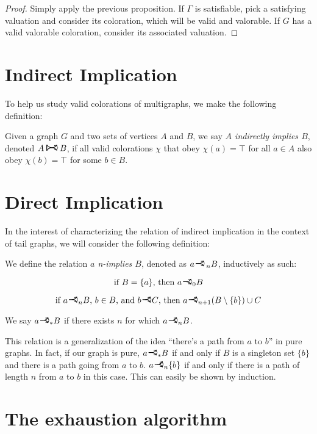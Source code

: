 \documentclass[11pt]{article}
\newcommand{\rightcurveor}{
\!
\mathrel{
  \begin{tikzpicture}[scale=0.8]
    \draw[thick,->] (0,0) arc (90:150:-2ex);
    \draw[thick,->] (0,0) arc (90:30:2ex);
    \draw[thick] (-1ex, 0) -- (0.1ex,0);
  \end{tikzpicture}
}\!
}
\newcommand{\Rightcurvearrow}{
\mathrel{
  \begin{tikzpicture}[scale=0.8]
    \draw[thick,->] (0,1ex) arc (30:150:-2ex);
    \draw[thick,->] (0,-1ex) arc (150:30:2ex);
    \draw[thick] (0, 1ex) -- (0, -1ex);
  \end{tikzpicture}
}
}
\begin{document}
\begin{proof}
Simply apply the previous proposition. If $\Gamma$ is satisfiable, pick a satisfying valuation and consider its coloration, which will be valid and valorable. If $G$ has a valid valorable coloration, consider its associated valuation.
\end{proof}

\section{Indirect Implication}

To help us study valid colorations of multigraphs, we make the following definition:

Given a graph $G$ and two sets of vertices $A$ and $B$, we say \emph{$A$ indirectly implies $B$}, denoted $A \Rightcurvearrow B$, if all valid colorations $\chi$ that obey $\chi(a) = \top$ for all $a \in A$ also obey $\chi(b) = \top$ for some $b \in B$.

\section{Direct Implication}

In the interest of characterizing the relation of indirect implication in the context of tail graphs, we will consider the following definition:

We define the relation \emph{$a$ n-implies $B$}, denoted as $a \rightcurveor_{\,n} B$, inductively as such:

\[\text{if } B = \{a\} \text{, then } a \rightcurveor_0 B\]


\[\text{if } a \rightcurveor_n B \text{, } b \in B \text{, and } b \rightcurveor C \text{, then } a \rightcurveor_{n+1} (B \setminus \{b\}) \cup C\]

We say $a \rightcurveor_* B$ if there exists $n$ for which $a \rightcurveor_n B$.

This relation is a generalization of the idea ``there's a path from $a$ to $b$'' in pure graphs. In fact, if our graph is pure, $a \rightcurveor_* B$ if and only if $B$ is a singleton set $\{b\}$ and there is a path going from $a$ to $b$. $a \rightcurveor_n \{b\}$ if and only if there is a path of length $n$ from $a$ to $b$ in this case. This can easily be shown by induction.

\section{The exhaustion algorithm}
\end{document}
